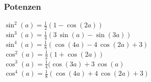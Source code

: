 		
		\subsubsection{Potenzen}
		$\sin^2(a) = \frac{1}{2}(1-\cos(2a))$ \\	
		$\sin^3(a) = \frac{1}{4}(3\, \sin(a) - \sin(3a))$ \\	
		$\sin^4(a) = \frac{1}{8}(\cos(4a) -4 \, \cos(2a) +3)$ \\	
		\vspace{0.2cm}
		$\cos^2(a) = \frac{1}{2}(1+\cos(2a))$ \\	
		$\cos^3(a) = \frac{1}{4}(\cos(3a) + 3 \, \cos(a)$ \\	
		$\cos^4(a) = \frac{1}{8}(\cos(4a) +4 \, \cos(2a) +3)$ 